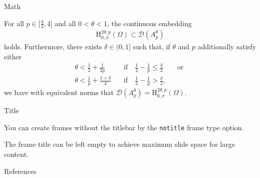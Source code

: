 \documentclass[english,institute=none]{tuhh_presentation}
\begin{document}
\begin{frame}{Math}
    \begin{theorem}
        For all $p \in \big[\frac{4}{3}, 4\big]$ and all $0 < \theta < 1$, the continuous embedding
        \begin{align*}
            \mathrm{H}^{2 \theta , p}_{0 , \sigma} (\Omega) \subset \mathcal{D}(A_p^{\theta})
        \end{align*}
        holds.
        Furthermore, there exists $\delta \in (0 , 1]$ such that, if $\theta$ and $p$ additionally satisfy either
        \begin{align*}
            \theta < \frac{1}{2} + \frac{1}{2 p} \quad &\text{if} \quad \frac{1}{2} - \frac{1}{p} \leq \frac{\delta}{2} \qquad\text{or } \\
            \theta < \frac{1}{p} + \frac{1 + \delta}{4} \quad &\text{if} \quad \frac{1}{2} - \frac{1}{p} > \frac{\delta}{2},
        \end{align*}
        we have with equivalent norms that $\mathcal{D}(A_p^{\theta}) = \mathrm{H}^{2 \theta , p}_{0 , \sigma} (\Omega).$
    \end{theorem}
\end{frame}

\begin{frame}[notitle]{Title}
    \begin{center}
        You can create frames without the titlebar by the \texttt{notitle} frame type option.
        
        The frame title can be left empty to achieve maximum slide space for large content.
    \end{center}
\end{frame}

\finalpage

\begin{frame}{References}
    \printbibliography
\end{frame}
\end{document}

